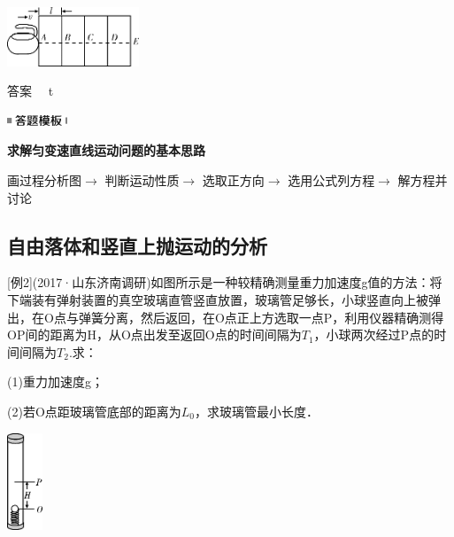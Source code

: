 \documentclass[cn,10.5pt,chinese,mac,chinesefont=founder]{elegantbook}
\begin{document}
\begin{center}\includegraphics[width=1.55556in,height=0.69444in]{media/image24.png}\end{center}

\begin{solution}
	答案　 t
\end{solution}
\begin{center}\includegraphics[width=0.71319in,height=0.12986in]{media/image25.png}

\textbf{求解匀变速直线运动问题的基本思路}
\end{center}


画过程分析图$\rightarrow$ 判断运动性质$\rightarrow$ 选取正方向$\rightarrow$ 选用公式列方程$\rightarrow$ 解方程并讨论

\newpage
\subsection{自由落体和竖直上抛运动的分析}

{[}例2{]}(2017·山东济南调研)如图所示是一种较精确测量重力加速度g值的方法：将下端装有弹射装置的真空玻璃直管竖直放置，玻璃管足够长，小球竖直向上被弹出，在O点与弹簧分离，然后返回，在O点正上方选取一点P，利用仪器精确测得OP间的距离为H，从O点出发至返回O点的时间间隔为$T_1$，小球两次经过P点的时间间隔为$T_2$.求：

(1)重力加速度g；

(2)若O点距玻璃管底部的距离为$L_0$，求玻璃管最小长度．

\begin{center}\includegraphics[width=0.41667in,height=1.13889in]{media/image26.png}\end{center}
\end{document}
